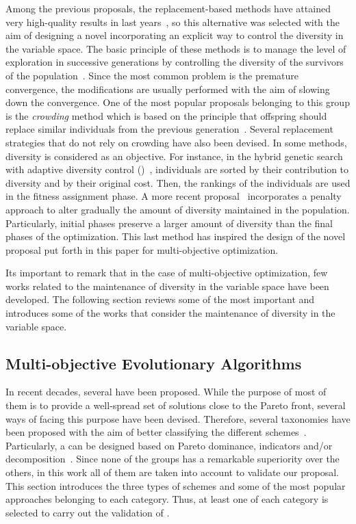 Among the previous proposals, the replacement-based methods have attained very high-quality results in last years~\cite{Segura:17}, so
this alternative was selected with the aim of designing a novel \MOEA{} incorporating an explicit way to control the diversity 
in the variable space.
%
The basic principle of these methods is to manage the level of exploration in successive generations by 
controlling the diversity of the survivors of the population~\cite{Segura:17}.
%
Since the most common problem is the premature convergence, the modifications are usually performed with the aim
of slowing down the convergence.
%
One of the most popular proposals belonging to this group is the \textit{crowding} method which
is based on the principle that offspring should replace similar individuals from the previous generation~\cite{Mengshoel:14}.
%
Several replacement strategies that do not rely on crowding have also been devised.
%
In some methods, diversity is considered as an objective.
%
For instance, in the hybrid genetic search with adaptive diversity control (\HGSADC{})~\cite{Vidal:13}, individuals are sorted 
by their contribution to diversity and by their original cost.
%
Then, the rankings of the individuals are used in the fitness assignment phase.
%
A more recent proposal~\cite{Segura:17} incorporates a penalty approach to alter gradually the amount of diversity 
maintained in the population.
%
Particularly, initial phases preserve a larger amount of diversity than the final phases of the optimization.
%
This last method has inspired the design of the novel proposal put forth in this paper for multi-objective optimization.
%

Its important to remark that in the case of multi-objective optimization, few works related to the maintenance of 
diversity in the variable space have been developed.
%
The following section reviews some of the most important \MOEAS{} and introduces some of the works that consider
the maintenance of diversity in the variable space.

\subsection{Multi-objective Evolutionary Algorithms}

In recent decades, several \MOEAS{} have been proposed. 
%
While the purpose of most of them is to provide a well-spread set of solutions close to the Pareto front,
several ways of facing this purpose have been devised.
%
Therefore, several taxonomies have been proposed with the aim of better classifying the different 
schemes~\cite{Joel:BOOK_MOEAs}.
%
Particularly, a \MOEA{} can be designed based on Pareto dominance, indicators and/or decomposition~\cite{Joel:StateArt}.
%
Since none of the groups has a remarkable superiority over the others, in this work all of them are taken into account to validate
our proposal.
%
This section introduces the three types of schemes and some of the most popular approaches belonging to each category.
%
Thus, at least one \MOEA{} of each category is selected to carry out the validation of \VSDMOEA{}.


